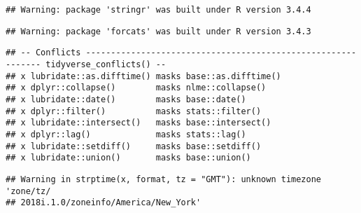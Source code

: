 \documentclass[]{article}
\newenvironment{Shaded}{\begin{snugshade}}{\end{snugshade}}
\newcommand{\KeywordTok}[1]{\textcolor[rgb]{0.13,0.29,0.53}{\textbf{#1}}}
\newcommand{\DataTypeTok}[1]{\textcolor[rgb]{0.13,0.29,0.53}{#1}}
\newcommand{\StringTok}[1]{\textcolor[rgb]{0.31,0.60,0.02}{#1}}
\newcommand{\CommentTok}[1]{\textcolor[rgb]{0.56,0.35,0.01}{\textit{#1}}}
\newcommand{\OperatorTok}[1]{\textcolor[rgb]{0.81,0.36,0.00}{\textbf{#1}}}
\newcommand{\NormalTok}[1]{#1}
\begin{document}
\begin{verbatim}
## Warning: package 'stringr' was built under R version 3.4.4
\end{verbatim}

\begin{verbatim}
## Warning: package 'forcats' was built under R version 3.4.3
\end{verbatim}

\begin{verbatim}
## -- Conflicts ------------------------------------------------------------- tidyverse_conflicts() --
## x lubridate::as.difftime() masks base::as.difftime()
## x dplyr::collapse()        masks nlme::collapse()
## x lubridate::date()        masks base::date()
## x dplyr::filter()          masks stats::filter()
## x lubridate::intersect()   masks base::intersect()
## x dplyr::lag()             masks stats::lag()
## x lubridate::setdiff()     masks base::setdiff()
## x lubridate::union()       masks base::union()
\end{verbatim}

\begin{Shaded}
\end{Shaded}

\begin{verbatim}
## Warning in strptime(x, format, tz = "GMT"): unknown timezone 'zone/tz/
## 2018i.1.0/zoneinfo/America/New_York'
\end{verbatim}

\begin{Shaded}
\end{Shaded}
\end{document}
